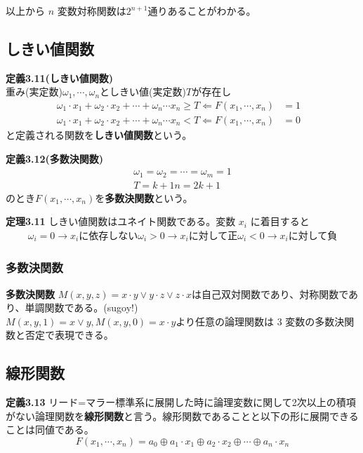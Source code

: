 \documentclass[a4j,10pt,oneside,openany,fleqn]{jsbook}
\begin{document}
以上から $n$ 変数対称関数は$2^{n+1}$通りあることがわかる。

\subsection{しきい値関数}

\textbf{定義3.11(しきい値関数)} \\
重み(実定数)$\omega_1, \cdots, \omega_n$としきい値(実定数)$T$が存在し
\begin{align*}
  \omega_1 \cdot x_1 + \omega_2 \cdot x_2 + \cdots + \omega_n \cdots x_n \geq T \Leftarrow F(x_1, \cdots ,x_n) &= 1&\\
  \omega_1 \cdot x_1 + \omega_2 \cdot x_2 + \cdots + \omega_n \cdots x_n < T \Leftarrow F(x_1, \cdots ,x_n) &= 0&
\end{align*}
と定義される関数を\textbf{しきい値関数}という。

\textbf{定義3.12(多数決関数)}
\begin{align*}
  \omega_1 = \omega_2 = \cdots = \omega_m = 1\\
  T = k+1
  n = 2k+1
\end{align*}
のとき$F(x_1, \cdots, x_n)$を\textbf{多数決関数}という。

\textbf{定理3.11}
しきい値関数はユネイト関数である。変数 $x_i$ に着目すると
\begin{align*}
  \omega_i = 0 \rightarrow x_i\textrm{に依存しない}
  \omega_i > 0 \rightarrow x_i\textrm{に対して正}
  \omega_i < 0 \rightarrow x_i\textrm{に対して負}
\end{align*}


\subsubsection{多数決関数}
\textbf{多数決関数} $M(x, y, z) = x\cdot y\vee y\cdot z\vee z\cdot x$は自己双対関数であり、対称関数であり、単調関数である。(sugoy!)\\
$M(x,y,1) = x\vee y, M(x, y, 0) = x \cdot y$より任意の論理関数は $3$ 変数の多数決関数と否定で表現できる。

\subsection{線形関数}
\textbf{定義3.13}
リード=マラー標準系に展開した時に論理変数に関して2次以上の積項がない論理関数を\textbf{線形関数}と言う。線形関数であることと以下の形に展開できることは同値である。
\[
F(x_1, \cdots, x_n) = a_0 \oplus a_1\cdot x_1 \oplus a_2\cdot x_2 \oplus \cdots \oplus a_n \cdot x_n
\]
\end{document}
